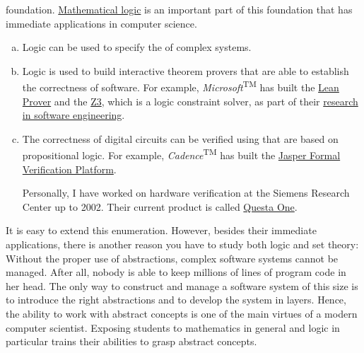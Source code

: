 foundation.  \href{https://en.wikipedia.org/wiki/Mathematical_logic}{Mathematical logic} 
is an important part of this foundation that has immediate applications in computer science. 
\begin{enumerate}[(a)]
\item Logic can be used to specify the  of complex systems.  
\item Logic is used to build interactive theorem provers that are able to establish the correctness of
      software.  For example, \textsl{Microsoft}\textsuperscript{TM} has built the
      \href{https://leanprover.github.io}{Lean Prover} and the
      \href{https://www.microsoft.com/en-us/research/project/z3-3/}{Z3}, which is a logic constraint solver, as
      part of their 
      \href{https://www.microsoft.com/en-us/research/group/research-software-engineering-rise/}{research in
        software engineering}. 
\item The correctness of digital circuits can be verified using  that are based on
      propositional logic.  For example, \textsl{Cadence}\textsuperscript{TM} has built the
      \href{https://www.cadence.com/en_US/home/tools/system-design-and-verification/formal-and-static-verification.html}{Jasper
        Formal Verification Platform}.

      Personally, I have worked on hardware verification at the Siemens Research Center up to 2002.  Their current product
      is called \href{https://www.siemens.com/en-us/products/ic/questa-one/formal-verification/}{Questa One}.
\end{enumerate}
It is easy to extend this enumeration.  However, besides their immediate applications, 
there is another reason you have to study both logic and set theory: Without the proper use of
{\color{blue}abstractions}, complex software systems cannot be managed.  After all, nobody is able to keep
millions of lines of program code in her head.  The only way to construct and manage a software system of this
size is to introduce the right abstractions and to develop the system in layers.  Hence, the ability
to work with abstract concepts is one of the main virtues of a modern computer scientist.  
Exposing students to mathematics in general and logic in particular trains their abilities to grasp abstract concepts.

